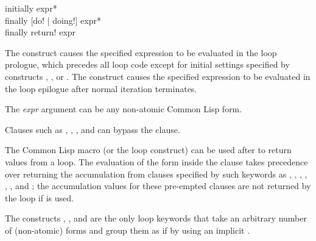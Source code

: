 \begin{new}

\begin{defloop}
initially {expr}* \\
finally [\!do! | \!doing!] {expr}* \\
finally \!return! expr

The  construct causes the specified expression to be evaluated
in the loop prologue, which precedes all loop code except for 
initial settings specified by constructs , , or
.
The  construct causes the specified expression to be evaluated
in the loop epilogue after normal iteration terminates.

The {\it expr\/} argument can be any non-atomic Common Lisp form.

Clauses such as , , , and 
can bypass the  clause.

The Common Lisp macro  (or the  loop construct) can be used
after  to return
values from a loop.  The evaluation of the  form inside the
 clause takes precedence over returning the accumulation
from clauses specified by such keywords as , , 
, , , , and ; 
the accumulation values for these pre-empted clauses are not returned by 
the loop if  is used.

The constructs , , and  are the
only loop keywords that take an arbitrary number of (non-atomic) forms and group
them as if by using an implicit .  

\goodbreak


\end{defloop}
\end{new}
